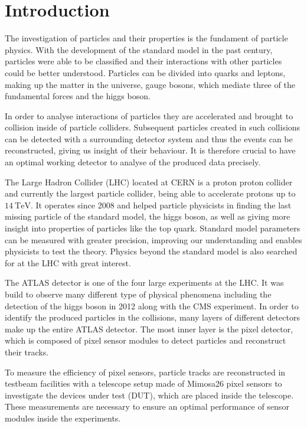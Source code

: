 \chapter{Introduction}
The investigation of particles and their properties is the fundament of particle physics. With the development of the standard model in the past century, particles were able to
be classified and their interactions with other particles could be better understood. Particles can be divided into quarks and leptons, making up the matter in the universe,
gauge bosons, which mediate three of the fundamental forces and the higgs boson.

In order to analyse interactions of particles they are accelerated and brought to collision inside of particle colliders. Subsequent particles created in such collisions
can be detected with a surrounding detector system and thus the events can be reconstructed, giving us insight of their behaviour. It is therefore crucial to have
an optimal working detector to analyse of the produced data precisely.

The Large Hadron Collider (LHC) located at CERN is a proton proton collider and currently the largest particle collider, being able to accelerate protons up to $\SI{14}{\tera\eV}$.
It operates since 2008 and helped particle physicists in finding the last missing particle of the standard model, the higgs boson, as well as giving more insight
into properties of particles like the top quark. Standard model parameters can be measured with greater precision, improving our understanding and enables physicists to
test the theory. Physics beyond the standard model is also searched for at the LHC with great interest.

The ATLAS detector is one of the four large experiments at the LHC. %
It was build to observe many different type of physical phenomena including the detection of the higgs boson in 2012 along with the CMS experiment. In order
to identify the produced particles in the collisions, many layers of different detectors make up the entire ATLAS detector. The most inner layer is the pixel detector, which
is composed of pixel sensor modules to detect particles and reconstruct their tracks.

To measure the efficiency of pixel sensors,
particle tracks are reconstructed in testbeam facilities with a telescope setup made of Mimosa26 pixel sensors to investigate the devices under test (DUT), which are
placed inside the telescope. These measurements are necessary to ensure an optimal performance of sensor modules inside the experiments.
